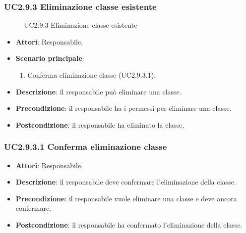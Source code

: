 \subsubsection{UC2.9.3 Eliminazione classe esistente}
\begin{figure}[H]
\centering
\noindent{}
\caption{UC2.9.3 Eliminazione classe esistente}
\end{figure}
\begin{itemize}
\item \textbf{Attori}: Responsabile.
\item \textbf{Scenario principale}:
\begin{enumerate}
\item Conferma eliminazione classe (UC2.9.3.1).
\end{enumerate}
\item \textbf{Descrizione}: il responsabile può eliminare una classe.
\item \textbf{Precondizione}: il responsabile ha i permessi per eliminare una classe.
\item \textbf{Postcondizione}: il responsabile ha eliminato la classe.
\end{itemize}
\subsubsection{UC2.9.3.1 Conferma eliminazione classe}
\begin{itemize}
\item \textbf{Attori}: Responsabile.
\item \textbf{Descrizione}: il responsabile deve confermare l'eliminazione della classe.
\item \textbf{Precondizione}: il responsabile vuole eliminare una classe e deve ancora confermare.
\item \textbf{Postcondizione}: il responsabile ha confermato l'eliminazione della classe.
\end{itemize}

